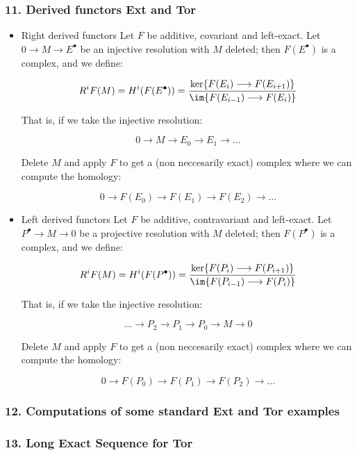 \documentclass[11pt]{article}
\begin{document}
\subsubsection*{11. Derived functors Ext and Tor}
\label{sec-3-2-6}
\begin{itemize}
\item Right derived functors
\label{sec-3-2-6-1}
Let $F$ be additive, covariant and left-exact. Let 
$0 \longrightarrow M \longrightarrow E^\bullet$ be an injective resolution with $M$ deleted; then $F(E^\bullet)$ 
is a complex, and we define:

\[R^i F(M) = H^i(F(E^\bullet)) = 
\frac{\ker \{F(E_i) \longrightarrow F(E_{i+1})\}}
{\im\{ F(E_{i-1}) \longrightarrow F(E_i)\}}\]

That is, if we take the injective resolution:

\[ 0 \longrightarrow M \longrightarrow E_0 \longrightarrow E_1 
\longrightarrow \dots\]

Delete $M$ and apply $F$ to get a (non neccesarily exact) complex where 
we can compute the homology:

\[ 0 \longrightarrow F(E_0) \longrightarrow F(E_1)
\longrightarrow F(E_2) \longrightarrow \dots\]

\item Left derived functors
\label{sec-3-2-6-2}
Let $F$ be additive, contravariant and left-exact. Let 
$P^\bullet \longrightarrow M \longrightarrow 0$ be a projective resolution with $M$ deleted; 
then $F(P^\bullet)$ is a complex, and we define:

\[R^i F(M) = H^i(F(P^\bullet)) = 
\frac{\ker \{F(P_i) \longrightarrow F(P_{i+1})\}}
{\im\{ F(P_{i-1}) \longrightarrow F(P_i)\}}\]

That is, if we take the injective resolution:

\[\dots \longrightarrow P_2\longrightarrow P_1\longrightarrow P_0
\longrightarrow M \longrightarrow 0\]

Delete $M$ and apply $F$ to get a (non neccesarily exact) complex 
where we can compute the homology:

\[ 0 \longrightarrow F(P_0) \longrightarrow F(P_1)
\longrightarrow F(P_2) \longrightarrow \dots\]
\end{itemize}

\subsubsection*{12. Computations of some standard Ext and Tor examples}
\label{sec-3-2-7}
\subsubsection*{13. Long Exact Sequence for Tor}
\label{sec-3-2-8}
\end{document}
